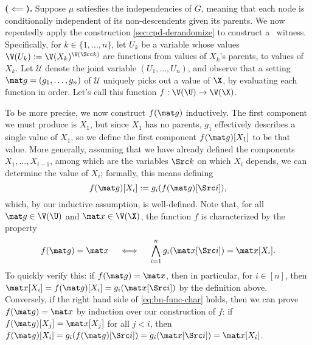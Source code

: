 \begin{subappendices}
\begin{lproof}
    \textbf{($\impliedby$).}
    Suppose $\mu$ satiesfies the independencies of $G$, meaning that each node is conditionally independent of its non-descendents given its parents.
    We now repeatedly apply the construction \cref{sec:cpd-derandomize} to construct a \scibility\ witness. 
    Specifically, for $k \in \{1, \ldots, n\}$, 
    let $U_k$ be a variable whose values $\V(U_k) := \V(X_k)^{\V(\Src k)}$ are functions from values of $X_k$'s parents, to values of $X_k$.
    Let $\mathcal U$ denote the joint variable $(U_1, \ldots, U_n)$,
    and observe that a setting $\mat g = (g_1, \ldots, g_n)$ of $\mathcal U$ uniquely picks out a value of $\X$, by evaluating each function in order. 
    Let's call this function $f : \V(\U) \to \V(\X)$. 
        
    To be more precise, we now construct $f(\mat g)$ inductively. 
    The first component we must produce is $X_1$, but since $X_1$ has no parents, $g_1$ effectively describes a single value of $X_1$, so we define the first component $f(\mat g)[X_1]$ to be that value.
    More generally, assuming that we have already defined the components $X_1, \ldots, X_{i-1}$, among which are the variables $\Src k$ on which $X_i$ depends, we can determine the value of $X_i$;
    formally, this means defining
    \[
        f(\mat g)[X_i] :=
            g_i( f(\mat g)[\Src i] ),
    \]
    which, by our inductive assumption, is well-defined.
    Note that, for all $\mat g \in \V(\U)$ and $\mat x \in \V(\X)$, the function $f$ is characterized by the property 
    \begin{equation}
            \label{eq:bn-func-char}
        f(\mat g) = \mat x
        \quad\iff\quad
        \bigwedge_{i=1}^n g_i(\mat x[\Src i]) = \mat x[X_i]. 
    \end{equation}
    To quickly verify this: if $f(\mat g) = \mat x$, then in particular, for $i \in [n]$, then $\mat x[X_i] = f(\mat g)[X_i] = g_i( \mat x[\Src i])$ by the definition above.
    Conversely, if the right hand side of \eqref{eq:bn-func-char} holds, then we can prove $f(\mat g) = \mat x$ by induction over our construction of $f$: if $f(\mat g)[X_{j}] = \mat x[X_j]$ for all $j < i$, then $f(\mat g)[X_i] = g_i( f(\mat g) [\Src i]) = g_i(\mat x[\Src i]) = \mat x[X_i]$.
    

\end{lproof}
\end{subappendices}
